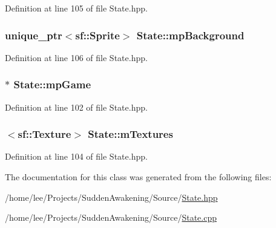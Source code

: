 Definition at line 105 of file State.\-hpp.

\hypertarget{class_state_ad77d6e8727cab4ac8ac5d44eacb41eba}{
\subsubsection[{mp\-Background}]{\setlength{\rightskip}{0pt plus 5cm}unique\-\_\-ptr$<$sf\-::\-Sprite$>$ State\-::mp\-Background\hspace{0.3cm}{\ttfamily [protected]}}}\label{class_state_ad77d6e8727cab4ac8ac5d44eacb41eba}


Definition at line 106 of file State.\-hpp.

\hypertarget{class_state_a418f507cf3deef8f3653b8209a9f7b85}{
\subsubsection[{mp\-Game}]{$\ast$ State\-::mp\-Game\hspace{0.3cm}{\ttfamily [protected]}}}\label{class_state_a418f507cf3deef8f3653b8209a9f7b85}


Definition at line 102 of file State.\-hpp.

\hypertarget{class_state_a4eb530bbd8c56bb10ab4e36adeb097d9}{
\subsubsection[{m\-Textures}]{$<$sf\-::\-Texture$>$ State\-::m\-Textures\hspace{0.3cm}{\ttfamily [protected]}}}\label{class_state_a4eb530bbd8c56bb10ab4e36adeb097d9}


Definition at line 104 of file State.\-hpp.



The documentation for this class was generated from the following files\-:\begin{DoxyCompactItemize}
\item 
/home/lee/\-Projects/\-Sudden\-Awakening/\-Source/\hyperlink{_state_8hpp}{State.\-hpp}\item 
/home/lee/\-Projects/\-Sudden\-Awakening/\-Source/\hyperlink{_state_8cpp}{State.\-cpp}\end{DoxyCompactItemize}
